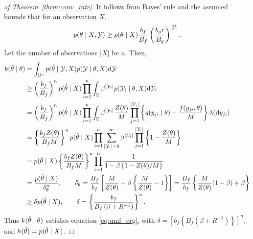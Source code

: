 \begin{proof}[of Theorem~\ref{thrm:conv_rate}]
It follows from Bayes' rule and the assumed bounds that for an observation $X$,
    $$p(\theta\mid X,\mathcal{Y}) \ge p(\theta\mid X) \frac{b_f}{B_f} \left(\frac{b_qr}{B_q}\right)^{|\mathcal{Y}|}.$$
 Let the number of observations $|X|$ be $n$. Then,
\begin{align}
  k(\htheta\mid \theta) &= \int_{\bU^n} p(\htheta\mid \cY,X) p(\cY\mid \theta,X) \mathrm{d}\cY \nonumber \\
  & \ge  \left(\frac{b_f}{B_f}\right)^n p(\htheta\mid X) \prod_{i=1}^n \int_{\bU} \beta^{|\cY_i|} p(\cY_i\mid \theta,X)  \mathrm{d}\cY_i \nonumber \\
    & =  \left(\frac{b_f}{B_f}\right)^n p(\htheta\mid X) \prod_{i=1}^n \int_{\bU} \beta^{|\cY_i|}  \frac{Z(\theta)}{M}  \prod_{j=1}^{|\cY_i|}  \left\{q(y_{ji}\mid \theta) - \frac{ f(y_{ji}, \theta)}{M} \right\} \lambda(\mathrm{d}y_{ji}) \nonumber \\
    & =  \left\{\frac{b_f Z(\theta)}{B_f M}\right\}^n{p(\htheta\mid X)} 
    \prod_{i=1}^n \sum_{|\cY_i| = 0}^{\infty} \beta^{|\cY_i|}  \prod_{j=1}^{|\cY_i|}  \left\{1 - \frac{Z(\theta)}{M} \right\} \nonumber \\
& =  {p(\htheta\mid X)} \left\{\frac{b_f Z(\theta)}{B_f M}\right\}^n\prod_{i=1}^n \frac{1}{1 - \beta\left\{1-Z(\theta)/M\right\}} \nonumber \\
    & =   \frac{p(\htheta\mid X)}{\delta_{\theta}^n}, \qquad {\delta_{\theta}} = \frac{B_f}{b_f}\left[ \frac{M}{Z(\theta)} - \beta\left\{\frac{M}{Z(\theta)}-1\right\}\right]
    =  \frac{B_f}{b_f}\left\{ \frac{M}{Z(\theta)} (1 - \beta) + \beta\right\} \nonumber \\ %
& \ge   {{\delta}}{p(\htheta\mid X)}, \qquad \delta = \left\{\frac{b_f}{B_f\left( \beta + R^{-1}\right)}\right\}^n. \nonumber
\end{align}
Thus $k(\hat{\theta}\mid \theta)$ satisfies equation \eqref{eq:unif_erg}, with 
$ \delta = \left[ {b_f}\left\{{B_f\left( \beta + R^{-1}\right)}\right\}\right]^n$, and $h(\hat{\theta}) = p(\hat{\theta}\mid X)$.
\end{proof}
